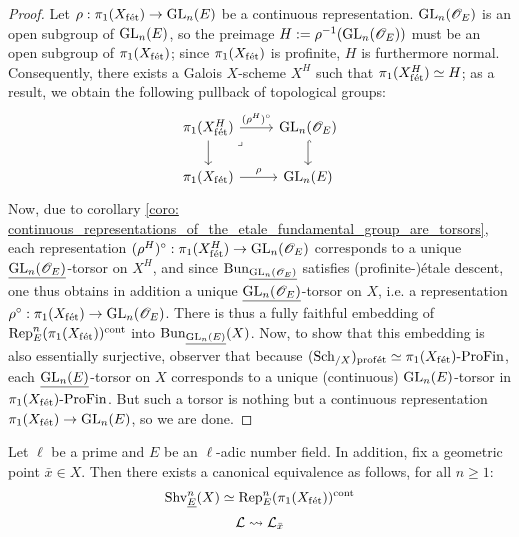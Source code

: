             \begin{proof}
                Let $\rho: \pi_1(X_{\mathrm{f\acute{e}t}}) \to \operatorname{GL}_n(E)$ be a continuous representation. $\operatorname{GL}_n(\mathscr{O}_E)$ is an open subgroup of $\operatorname{GL}_n(E)$, so the preimage $H := \rho^{-1}(\operatorname{GL}_n(\mathscr{O}_E))$ must be an open subgroup of $\pi_1(X_{\mathrm{f\acute{e}t}})$; since $\pi_1(X_{\mathrm{f\acute{e}t}})$ is profinite, $H$ is furthermore normal. Consequently, there exists a Galois $X$-scheme $X^H$ such that $\pi_1(X^H_{\mathrm{f\acute{e}t}}) \simeq H$; as a result, we obtain the following pullback of topological groups:
                    $$
                        \begin{tikzcd}
                        	{\pi_1(X^H_{\fet})} & {\GL_n(\scrO_E)} \\
                        	{\pi_1(X_{\fet})} & {\GL_n(E)}
                        	\arrow[hook, from=1-2, to=2-2]
                        	\arrow["\rho", from=2-1, to=2-2]
                        	\arrow[from=1-1, to=2-1]
                        	\arrow["{(\rho^H)^{\circ}}", from=1-1, to=1-2]
                        	\arrow["\lrcorner"{anchor=center, pos=0.125}, draw=none, from=1-1, to=2-2]
                        \end{tikzcd}
                    $$
                Now, due to corollary \ref{coro: continuous_representations_of_the_etale_fundamental_group_are_torsors}, each representation $(\rho^H)^{\circ}: \pi_1(X^H_{\mathrm{f\acute{e}t}}) \to \operatorname{GL}_n(\mathscr{O}_E)$ corresponds to a unique $\underline{\operatorname{GL}_n(\mathscr{O}_E)}$-torsor on $X^H$, and since $\mathrm{Bun}_{\underline{\operatorname{GL}_n(\mathscr{O}_E)}}$ satisfies (profinite-)\'etale descent, one thus obtains in addition a unique $\underline{\operatorname{GL}_n(\mathscr{O}_E)}$-torsor on $X$, i.e. a representation $\rho^{\circ}: \pi_1(X_{\mathrm{f\acute{e}t}}) \to \operatorname{GL}_n(\mathscr{O}_E)$. There is thus a fully faithful embedding of $\mathrm{Rep}_E^n(\pi_1(X_{\mathrm{f\acute{e}t}}))^{\mathrm{cont}}$ into $\mathrm{Bun}_{\underline{\operatorname{GL}_n(E)}}(X)$. Now, to show that this embedding is also essentially surjective, observer that because $(\mathrm{Sch}_{/X})_{\mathrm{prof\acute{e}t}} \simeq \pi_1(X_{\mathrm{f\acute{e}t}})\text{-}\mathrm{Pro}\mathrm{Fin}$, each $\underline{\operatorname{GL}_n(E)}$-torsor on $X$ corresponds to a unique (continuous) $\operatorname{GL}_n(E)$-torsor in $\pi_1(X_{\mathrm{f\acute{e}t}})\text{-}\mathrm{Pro}\mathrm{Fin}$. But such a torsor is nothing but a continuous representation $\pi_1(X_{\mathrm{f\acute{e}t}}) \to \operatorname{GL}_n(E)$, so we are done.
            \end{proof}
        \begin{corollary} \label{coro: representations_of_the_etale_fundamental_group}
            Let $\ell$ be a prime and $E$ be an $\ell$-adic number field. In addition, fix a geometric point $\bar{x} \in X$. Then there exists a canonical equivalence as follows, for all $n \geq 1$:
                $$\mathrm{Shv}^n_{\underline{E}}(X) \simeq \mathrm{Rep}_E^n(\pi_1(X_{\mathrm{f\acute{e}t}}))^{\mathrm{cont}}$$
                $$\mathcal{L} \leadsto \mathcal{L}_{\bar{x}}$$
        \end{corollary}
            
